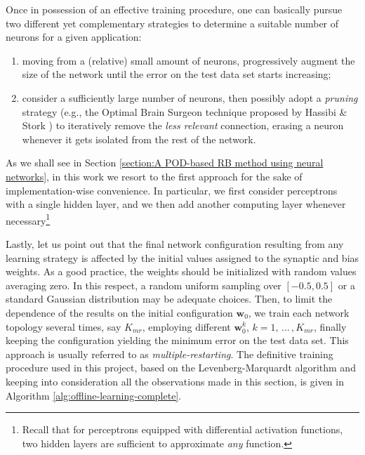 \documentclass[12pt, a4paper, twoside, openright]{report}
\numberwithin{equation}{chapter}
\theoremstyle{theorem}
\theoremstyle{definition}
\theoremstyle{remark}
\theoremstyle{proposition}
\numberwithin{figure}{chapter}
\begin{document}
		Once in possession of an effective training procedure, one can basically pursue two different yet complementary strategies to determine a suitable number of neurons for a given application:
		\begin{enumerate}[label=(\alph*)]
			\item moving from a (relative) small amount of neurons, progressively augment the size of the network until the error on the test data set starts increasing;
			\item consider a sufficiently large number of neurons, then possibly adopt a \emph{pruning} strategy (e.g., the Optimal Brain Surgeon technique proposed by Hassibi \& Stork \cite{OBS}) to iteratively remove the \emph{less relevant} connection, erasing a neuron whenever it gets isolated from the rest of the network.
		\end{enumerate}
		As we shall see in Section \ref{section:A POD-based RB method using neural networks}, in this work we resort to the first approach for the sake of implementation-wise convenience. In particular, we first consider perceptrons with a single hidden layer, and we then add another computing layer whenever necessary\footnote{Recall that for perceptrons equipped with differential activation functions, two hidden layers are sufficient to approximate \emph{any} function.}
		
		Lastly, let us point out that the final network configuration resulting from any learning strategy is affected by the initial values assigned to the synaptic and bias weights. As a good practice, the weights should be initialized with random values averaging zero. In this respect, a random uniform sampling over $[-0.5,0.5]$ or a standard Gaussian distribution may be adequate choices. Then, to limit the dependence of the results on the initial configuration $\mathbf{w}_0$, we train each network topology several times, say $K_{mr}$, employing different $\mathbf{w}_0^k$, $k = 1, \, \ldots \, , K_{mr}$, finally keeping the configuration yielding the minimum error on the test data set. This approach is usually referred to as \emph{multiple-restarting}. The definitive training procedure used in this project, based on the Levenberg-Marquardt algorithm and keeping into consideration all the observations made in this section, is given in Algorithm \ref{alg:offline-learning-complete}.
			
\end{document}
